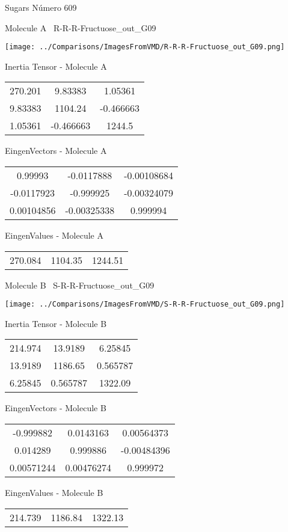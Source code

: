 \vtab[-3cm]
\begin{center}
{\large Sugars \tab Número 609}
\end{center}
\begin{multicols}{2}
\begin{center}

Molecule A \
R-R-R-Fructuose\_out\_G09

\texttt{[image: ../Comparisons/ImagesFromVMD/R-R-R-Fructuose\_out\_G09.png]}

Inertia Tensor - Molecule A \\
\begin{tabular}{|c c c|}
270.201	 & 	9.83383	 & 	1.05361	 \\
9.83383	 & 	1104.24	 & 	-0.466663	 \\
1.05361	 & 	-0.466663	 & 	1244.5
\end{tabular}

\vtab
 EingenVectors - Molecule A     \\
\begin{tabular}{|c c c|}
0.99993	 & 	-0.0117888	 & 	-0.00108684	 \\
-0.0117923	 & 	-0.999925	 & 	-0.00324079	 \\
0.00104856	 & 	-0.00325338	 & 	0.999994
\end{tabular}

\vtab
 EingenValues - Molecule A     \\
\begin{tabular}{|c c c|}
270.084	 & 	1104.35	 & 	1244.51	 \\
\end{tabular}
\columnbreak

Molecule B \
S-R-R-Fructuose\_out\_G09

\texttt{[image: ../Comparisons/ImagesFromVMD/S-R-R-Fructuose\_out\_G09.png]}

Inertia Tensor - Molecule B \\
\begin{tabular}{|c c c|}
214.974	 & 	13.9189	 & 	6.25845	 \\
13.9189	 & 	1186.65	 & 	0.565787	 \\
6.25845	 & 	0.565787	 & 	1322.09
\end{tabular}

\vtab
 EingenVectors - Molecule B     \\
\begin{tabular}{|c c c|}
-0.999882	 & 	0.0143163	 & 	0.00564373	 \\
0.014289	 & 	0.999886	 & 	-0.00484396	 \\
0.00571244	 & 	0.00476274	 & 	0.999972
\end{tabular}

\vtab
 EingenValues - Molecule B     \\
\begin{tabular}{|c c c|}
214.739	 & 	1186.84	 & 	1322.13	 \\
\end{tabular}

\end{center}
\end{multicols}

